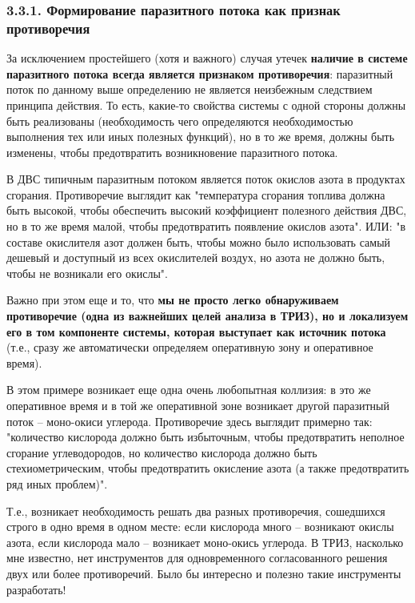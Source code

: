 \documentclass[a4paper,11pt]{article}
\begin{document}
\subsubsection{3.3.1. Формирование паразитного потока как признак
  противоречия} 

За исключением простейшего (хотя и важного) случая утечек \textbf{наличие в
  системе паразитного потока всегда является признаком противоречия}:
паразитный поток по данному выше определению не является неизбежным следствием
принципа действия.  То есть, какие-то свойства системы с одной стороны должны
быть реализованы (необходимость чего определяются необходимостью выполнения
тех или иных полезных функций), но в то же время, должны быть изменены, чтобы
предотвратить возникновение паразитного потока.

В ДВС типичным паразитным потоком является поток окислов азота в продуктах
сгорания. Противоречие выглядит как "температура сгорания топлива должна быть
высокой, чтобы обеспечить высокий коэффициент полезного действия ДВС, но в то
же время малой, чтобы предотвратить появление окислов азота". ИЛИ: "в составе
окислителя азот должен быть, чтобы можно было использовать самый дешевый и
доступный из всех окислителей воздух, но азота не должно быть, чтобы не
возникали его окислы".

Важно при этом еще и то, что \textbf{мы не просто легко обнаруживаем
  противоречие (одна из важнейших целей анализа в ТРИЗ), но и локализуем его в
  том компоненте системы, которая выступает как источник потока} (т.е., сразу
же автоматически определяем оперативную зону и оперативное время).

В этом примере возникает еще одна очень любопытная коллизия: в это же
оперативное время и в той же оперативной зоне возникает другой паразитный
поток -- моно-окиси углерода. Противоречие здесь выглядит примерно так:
"количество кислорода должно быть избыточным, чтобы предотвратить неполное
сгорание углеводородов, но количество кислорода должно быть стехиометрическим,
чтобы предотвратить окисление азота (а также предотвратить ряд иных проблем)".

Т.е., возникает необходимость решать два разных противоречия, сошедшихся
строго в одно время в одном месте: если кислорода много -- возникают окислы
азота, если кислорода мало -- возникает моно-окись углерода. В ТРИЗ, насколько
мне известно, нет инструментов для одновременного согласованного решения двух
или более противоречий. Было бы интересно и полезно такие инструменты
разработать!
\end{document}
